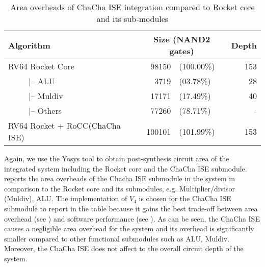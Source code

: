 \begin{table}
	\caption{Area overheads of ChaCha ISE integration compared to Rocket core and its sub-modules}
	\label{tab:res:hardcost2}
	\begin{tabular}{lrlr}
		\toprule            
		Algorithm        &     \multicolumn{2}{c}{Size (NAND2 gates)}       & Depth \\
		
		\midrule
		RV64 Rocket Core               &    98150 & (100.00\%)     &  153  \\
		~~~~~|-- ALU                   &     3719 & (03.78\%)  &   28  \\
		~~~~~|-- Muldiv                &    17171 & (17.49\%)  &   40  \\
		~~~~~|-- Others                &    77260 & (78.71\%)  &    -  \\
		RV64 Rocket + RoCC(ChaCha ISE) &   100101 & (101.99\%)  &  153  \\ 
		
		\bottomrule
	\end{tabular} 
\end{table}

Again, we use the Yosys tool to obtain post-synthesis circuit area of the integrated system including the Rocket core and the ChaCha ISE submodule.  reports the area overheads of the Chacha ISE submodule in the system in comparison to the Rocket core and its submodules, e.g. Multiplier/divisor (Muldiv), ALU. The implementation of $V_4$ is chosen for the ChaCha ISE submodule to report in the table because it gains the best trade-off between area overhead (see ) and software performance (see ). As can be seen, the ChaCha ISE causes a negligible area overhead for the system and its overhead is significantly smaller compared to other functional submodules such as ALU, Muldiv. Moreover, the ChaCha ISE does not affect to the overall circuit depth of the system.



